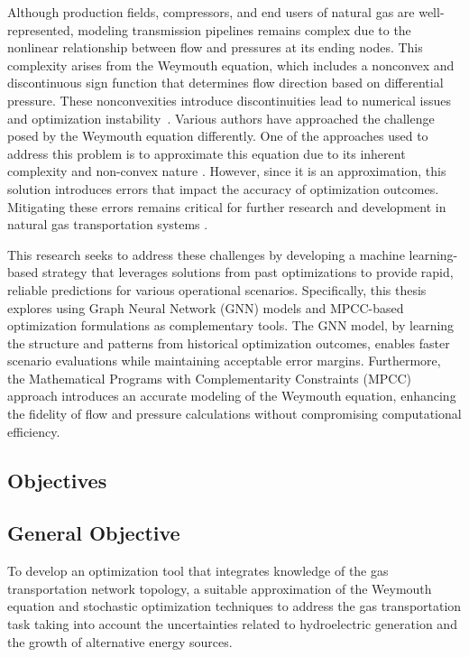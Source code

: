 Although production fields, compressors, and end users of natural gas are well-represented, modeling transmission pipelines remains complex due to the nonlinear relationship between flow and pressures at its ending nodes. This complexity arises from the Weymouth equation, which includes a nonconvex and discontinuous sign function that determines flow direction based on differential pressure. These nonconvexities introduce discontinuities lead to numerical issues and optimization instability~\cite{YANG2020106023, JIANG2021106460}. Various authors have approached the challenge posed by the Weymouth equation differently. One of the approaches used to address this problem is to approximate this equation due to its inherent complexity and non-convex nature \cite{9031712}. However, since it is an approximation, this solution introduces errors that impact the accuracy of optimization outcomes. Mitigating these errors remains critical for further research and development in natural gas transportation systems \cite{review}.

This research seeks to address these challenges by developing a machine learning-based strategy that leverages solutions from past optimizations to provide rapid, reliable predictions for various operational scenarios. Specifically, this thesis explores using Graph Neural Network (GNN) models and MPCC-based optimization formulations as complementary tools. The GNN model, by learning the structure and patterns from historical optimization outcomes, enables faster scenario evaluations while maintaining acceptable error margins. Furthermore, the Mathematical Programs with Complementarity Constraints (MPCC) approach introduces an accurate modeling of the Weymouth equation, enhancing the fidelity of flow and pressure calculations without compromising computational efficiency.

\subsection{Objectives}

\subsection{General Objective}
To develop an optimization tool that integrates knowledge of the gas transportation network topology, a suitable approximation of the Weymouth equation and stochastic optimization techniques to address the gas transportation task taking into account the uncertainties related to hydroelectric generation and the growth of alternative energy sources.

